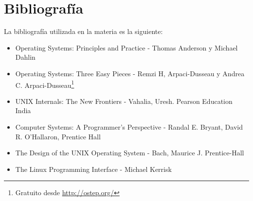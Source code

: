 \documentclass[titlepage,a4paper]{article}
\begin{document}
\section{Bibliografía}\label{sec:bibliografia}
La bibliografía utilizada en la materia es la siguiente:
\begin{itemize}
    \item Operating Systems: Principles and Practice - Thomas Anderson y Michael Dahlin
    \item Operating Systems: Three Easy Pieces - Remzi H, Arpaci-Dusseau y Andrea C. Arpaci-Dusseau\footnote{Gratuito desde \href{http://ostep.org/}{http://ostep.org/}}
    \item UNIX Internals: The New Frontiers - Vahalia, Uresh. Pearson Education India
    \item Computer Systems: A Programmer’s Perspective - Randal E. Bryant, David R. O’Hallaron, Prentice Hall
    \item The Design of the UNIX Operating System - Bach, Maurice J. Prentice-Hall
    \item The Linux Programming Interface - Michael Kerrisk
\end{itemize}
\end{document}
